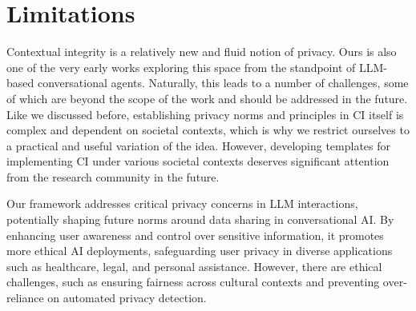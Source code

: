 \section*{Limitations}
\vspace{-4pt}
Contextual integrity is a relatively new and fluid notion of privacy. Ours is also one of the very early works exploring this space from the standpoint of LLM-based conversational agents. Naturally, this leads to a number of challenges, some of which are beyond the scope of the work and should be addressed in the future. Like we discussed before, establishing privacy norms and principles in CI itself is complex and dependent on societal contexts, which is why we restrict ourselves to a practical and useful variation of the idea. However, developing templates for implementing CI under various societal contexts deserves significant attention from the research community in the future.

Our framework addresses critical privacy concerns in LLM interactions, potentially shaping future norms around data sharing in conversational AI. By enhancing user awareness and control over sensitive information, it promotes more ethical AI deployments, safeguarding user privacy in diverse applications such as healthcare, legal, and personal assistance. However, there are ethical challenges, such as ensuring fairness across cultural contexts and preventing over-reliance on automated privacy detection. 
